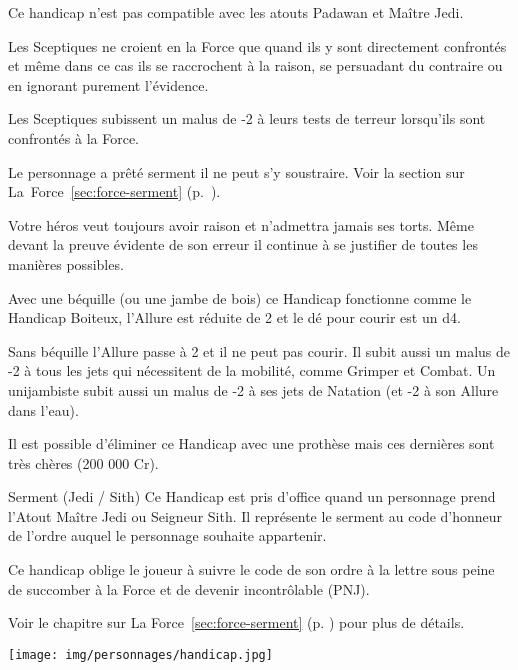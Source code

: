 \begin{description}[align=left]
        Ce handicap n’est pas compatible avec les atouts Padawan et Maître Jedi.

    \item [Sceptique (Mineur)]
        Les Sceptiques ne croient en la Force que quand ils y sont directement confrontés et même dans ce cas ils se raccrochent à la raison, se persuadant du contraire ou en ignorant purement l’évidence.

        Les Sceptiques subissent un malus de -2 à leurs tests de terreur lorsqu’ils sont confrontés à la Force.

    \item [Serment (Jedi ou Sith) (Majeur)]
        Le personnage a prêté serment il ne peut s’y soustraire. Voir la section sur La~Force~\ref{sec:force-serment} (p.~\pageref{sec:force-serment}).

    \item [Têtu (Mineur)]
        Votre héros veut toujours avoir raison et n’admettra jamais ses torts. Même devant la preuve évidente de son erreur il continue à se justifier de toutes les manières possibles.

    \item [Unijambiste (Majeur)]
        Avec une béquille (ou une jambe de bois) ce Handicap fonctionne comme le Handicap Boiteux, l’Allure est réduite de 2 et le dé pour courir est un d4.

        Sans béquille l’Allure passe à 2 et il ne peut pas courir. Il subit aussi un malus de -2 à tous les jets qui nécessitent de la mobilité, comme Grimper et Combat. Un unijambiste subit aussi un malus de -2 à ses jets de Natation (et -2 à son Allure dans l’eau).

        Il est possible d’éliminer ce Handicap avec une prothèse mais ces dernières sont très chères (200 000 Cr).

\end{description}

\begin{paperbox}{Serment (Jedi / Sith)}
    Ce Handicap est pris d’office quand un personnage prend l’Atout Maître Jedi ou Seigneur Sith. Il représente le serment au code d’honneur de l’ordre auquel le personnage souhaite appartenir.

    Ce handicap oblige le joueur à suivre le code de son ordre à la lettre sous peine de succomber à la Force et de devenir incontrôlable (PNJ).

    Voir le chapitre sur La Force~\ref{sec:force-serment} (p. \pageref{sec:force-serment}) pour plus de détails.
\end{paperbox}

\newpage
\vspace*{\fill}
\texttt{[image: img/personnages/handicap.jpg]}
